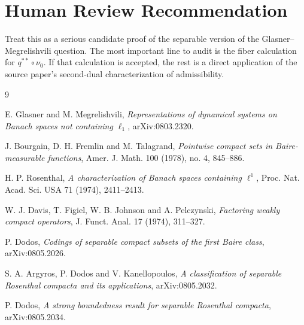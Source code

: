 \documentclass[11pt]{article}
\begin{document}
\section*{Human Review Recommendation}

Treat this as a serious candidate proof of the separable version of the
Glasner--Megrelishvili question.  The most important line to audit is the
fiber calculation for \(q^{**}\circ\nu_0\).  If that calculation is accepted,
the rest is a direct application of the source paper's second-dual
characterization of admissibility.

\begin{thebibliography}{9}

E. Glasner and M. Megrelishvili,
\emph{Representations of dynamical systems on Banach spaces not containing
\(\ell_1\)},
arXiv:0803.2320.

J. Bourgain, D. H. Fremlin and M. Talagrand,
\emph{Pointwise compact sets in Baire-measurable functions},
Amer. J. Math. 100 (1978), no. 4, 845--886.

H. P. Rosenthal,
\emph{A characterization of Banach spaces containing \(\ell^1\)},
Proc. Nat. Acad. Sci. USA 71 (1974), 2411--2413.

W. J. Davis, T. Figiel, W. B. Johnson and A. Pelczynski,
\emph{Factoring weakly compact operators},
J. Funct. Anal. 17 (1974), 311--327.

P. Dodos,
\emph{Codings of separable compact subsets of the first Baire class},
arXiv:0805.2026.

S. A. Argyros, P. Dodos and V. Kanellopoulos,
\emph{A classification of separable Rosenthal compacta and its applications},
arXiv:0805.2032.

P. Dodos,
\emph{A strong boundedness result for separable Rosenthal compacta},
arXiv:0805.2034.

\end{thebibliography}
\end{document}
